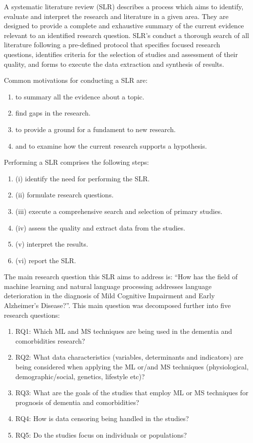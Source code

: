\documentclass[12pt]{article}
\begin{document}
A systematic literature review (SLR) describes a process which aims to identify, evaluate and interpret the research and literature in a given area. They are designed to provide a complete and exhaustive summary of the current evidence relevant to an identified research question. SLR's conduct a thorough search of all literature following a pre-defined protocol that specifies focused research questions, identifies criteria for the selection of studies and assessment of their quality, and forms to execute the data extraction and synthesis of results. 
\par 
Common motivations for conducting a SLR are: 
\begin{enumerate}
	\item to summary all the evidence about a topic.
	\item find gaps in the research. 
	\item to provide a ground for a fundament to new research.
	\item and to examine how the current research supports a hypothesis. 
\end{enumerate}

Performing a SLR comprises the following steps: 
\begin{enumerate}
	\item (i) identify the need for performing the SLR.
	\item (ii) formulate research questions.
	\item (iii) execute a comprehensive search and selection of primary studies.
	\item (iv) assess the quality and extract data from the studies.
	\item (v) interpret the results.
	\item (vi) report the SLR.
\end{enumerate}

The main research question this SLR aims to address is: “How has the field of machine learning and natural language processing addresses language deterioration in the diagnosis of Mild Cognitive Impairment and Early Alzheimer's Disease?”. This main question was decomposed further into five research questions:
\begin{enumerate}
	\item RQ1: Which ML and MS techniques are being used in the dementia and comorbidities research?
	\item RQ2: What data characteristics (variables, determinants and indicators) are being considered when applying the ML or/and MS techniques (physiological, demographic/social, genetics, lifestyle etc)?
	\item RQ3: What are the goals of the studies that employ ML or MS techniques for prognosis of dementia and comorbidities?
	\item RQ4: How is data censoring being handled in the studies?
	\item RQ5: Do the studies focus on individuals or populations?
\end{enumerate}
\end{document}
